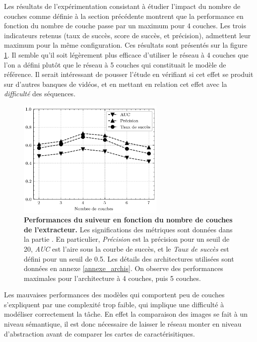 \documentclass[10pt,twocolumn,letterpaper,french]{article}
\begin{document}
Les résultats de l'expérimentation consistant à étudier l'impact du nombre de couches comme définie à la section précédente montrent que la performance en fonction du nombre de couche passe par un maximum pour 4 couches. Les trois indicateurs retenus (taux de succès, score de succès, et précision), admettent leur maximum pour la même configuration. Ces résultats sont présentés sur la figure \ref{courbes_fctlay_prec}. Il semble qu'il soit légèrement plus efficace d'utiliser le réseau à 4 couches que l'on a défini plutôt que le réseau à 5 couches qui constituait le modèle de référence. Il serait intéressant de pousser l'étude en vérifiant si cet effet se produit sur d'autres banques de vidéos, et en mettant en relation cet effet avec la \textit{difficulté} des séquences.

\begin{figure}[!h]
  \centering
  \includegraphics[width=200pt]{images/layers/courbes_fctlay_perfs.png} 
  \caption{\textbf{Performances du suiveur en fonction du nombre de couches de l'extracteur.} Les significations des métriques sont données dans la partie \textit{}. En particulier, \textit{Précision} est la précision pour un seuil de 20, \textit{AUC} est l'aire sous la courbe de succès, et le \textit{Taux de succès} est défini pour un seuil de 0.5. Les détails des architectures utilisées sont données en annexe \ref{annexe_archis}. On observe des performances maximales pour l'architecture à 4 couches, puis 5 couches.}
  \label{courbes_fctlay_prec}
  \end{figure}

Les mauvaises performances des modèles qui comportent peu de couches s'expliquent par une complexité trop faible, qui implique une difficulté à modéliser correctement la tâche. En effet la comparaison des images se fait à un niveau sémantique, il est donc nécessaire de laisser le réseau monter en niveau d'abstraction avant de comparer les cartes de caractérisitiques.
\end{document}
